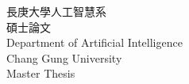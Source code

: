 \documentclass{report}
\begin{document}
	
	\begin{center}
		{\fontsize{18}{27} 長庚大學人工智慧系} \\
		{\fontsize{18}{27} 碩士論文} \\
		{\fontsize{14}{21} Department of Artificial Intelligence} \\
		{\fontsize{16}{24} Chang Gung University} \\
		{\fontsize{16}{24} Master Thesis}
	\end{center}
	
\end{document}
